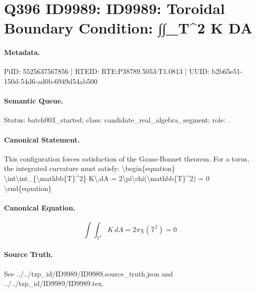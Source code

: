 \section*{Q396 ID9989: ID9989: Toroidal Boundary Condition: ∫∫\_T\textasciicircum{}2 K DA}
\paragraph{Metadata.}
PiID: 5525637567856 | RTEID: RTE:P38789.5053:T1.0813 | UUID: b2b65e51-150d-54d6-ad0b-6949d54ab500

\paragraph{Semantic Queue.}
Status: batch003\_started; class: candidate\_real\_algebra\_segment; role: .

\paragraph{Canonical Statement.}
This configuration forces satisfaction of the Gauss-Bonnet theorem. For a torus, the integrated curvature must satisfy: \textbackslash{}begin\{equation\} \textbackslash{}int\textbackslash{}int\_\{\textbackslash{}mathbb\{T\}\textasciicircum{}2\} K\textbackslash{},dA = 2\textbackslash{}pi\textbackslash{}chi(\textbackslash{}mathbb\{T\}\textasciicircum{}2) = 0 \textbackslash{}end\{equation\}

\paragraph{Canonical Equation.}
\[
\int\int_{\mathbb{T}^2} K\,dA = 2\pi\chi(\mathbb{T}^2) = 0
\]

\paragraph{Source Truth.}
See ../../tzp\_id/ID9989/ID9989.source\_truth.json and ../../tzp\_id/ID9989/ID9989.tex.

